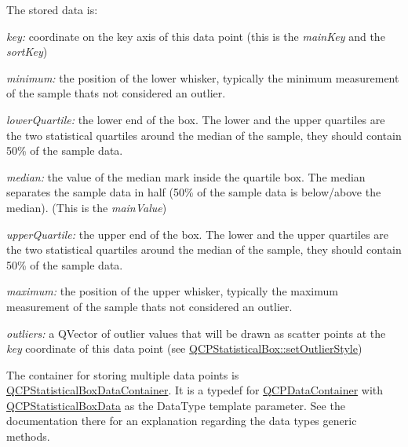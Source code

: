 The stored data is\+:

\begin{DoxyItemize}
\item {\itshape key\+:} coordinate on the key axis of this data point (this is the {\itshape main\+Key} and the {\itshape sort\+Key})\end{DoxyItemize}
\begin{DoxyItemize}
\item {\itshape minimum\+:} the position of the lower whisker, typically the minimum measurement of the sample that\textquotesingle{}s not considered an outlier.\end{DoxyItemize}
\begin{DoxyItemize}
\item {\itshape lower\+Quartile\+:} the lower end of the box. The lower and the upper quartiles are the two statistical quartiles around the median of the sample, they should contain 50\% of the sample data.\end{DoxyItemize}
\begin{DoxyItemize}
\item {\itshape median\+:} the value of the median mark inside the quartile box. The median separates the sample data in half (50\% of the sample data is below/above the median). (This is the {\itshape main\+Value})\end{DoxyItemize}
\begin{DoxyItemize}
\item {\itshape upper\+Quartile\+:} the upper end of the box. The lower and the upper quartiles are the two statistical quartiles around the median of the sample, they should contain 50\% of the sample data.\end{DoxyItemize}
\begin{DoxyItemize}
\item {\itshape maximum\+:} the position of the upper whisker, typically the maximum measurement of the sample that\textquotesingle{}s not considered an outlier.\end{DoxyItemize}
\begin{DoxyItemize}
\item {\itshape outliers\+:} a Q\+Vector of outlier values that will be drawn as scatter points at the {\itshape key} coordinate of this data point (see \mbox{\hyperlink{class_q_c_p_statistical_box_ad5241943422eb8e58360a97e99ad6aa7}{Q\+C\+P\+Statistical\+Box\+::set\+Outlier\+Style}})\end{DoxyItemize}
The container for storing multiple data points is \mbox{\hyperlink{qcustomplot_8h_a8b773c0c35f8f924701ced6e9915e4c7}{Q\+C\+P\+Statistical\+Box\+Data\+Container}}. It is a typedef for \mbox{\hyperlink{class_q_c_p_data_container}{Q\+C\+P\+Data\+Container}} with \mbox{\hyperlink{class_q_c_p_statistical_box_data}{Q\+C\+P\+Statistical\+Box\+Data}} as the Data\+Type template parameter. See the documentation there for an explanation regarding the data type\textquotesingle{}s generic methods.

